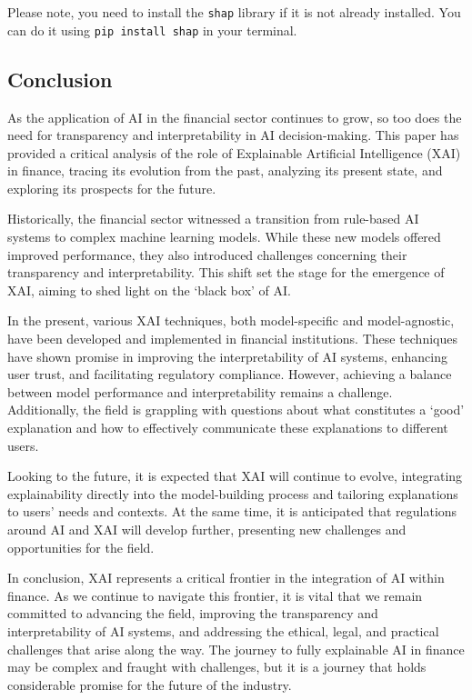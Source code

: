 \documentclass[
  letterpaper,
  DIV=11,
  numbers=noendperiod]{scrartcl}
\begin{document}
Please note, you need to install the \texttt{shap} library if it is not
already installed. You can do it using \texttt{pip\ install\ shap} in
your terminal.

\hypertarget{conclusion}{%
\subsection{Conclusion}\label{conclusion}}

As the application of AI in the financial sector continues to grow, so
too does the need for transparency and interpretability in AI
decision-making. This paper has provided a critical analysis of the role
of Explainable Artificial Intelligence (XAI) in finance, tracing its
evolution from the past, analyzing its present state, and exploring its
prospects for the future.

Historically, the financial sector witnessed a transition from
rule-based AI systems to complex machine learning models. While these
new models offered improved performance, they also introduced challenges
concerning their transparency and interpretability. This shift set the
stage for the emergence of XAI, aiming to shed light on the `black box'
of AI.

In the present, various XAI techniques, both model-specific and
model-agnostic, have been developed and implemented in financial
institutions. These techniques have shown promise in improving the
interpretability of AI systems, enhancing user trust, and facilitating
regulatory compliance. However, achieving a balance between model
performance and interpretability remains a challenge. Additionally, the
field is grappling with questions about what constitutes a `good'
explanation and how to effectively communicate these explanations to
different users.

Looking to the future, it is expected that XAI will continue to evolve,
integrating explainability directly into the model-building process and
tailoring explanations to users' needs and contexts. At the same time,
it is anticipated that regulations around AI and XAI will develop
further, presenting new challenges and opportunities for the field.

In conclusion, XAI represents a critical frontier in the integration of
AI within finance. As we continue to navigate this frontier, it is vital
that we remain committed to advancing the field, improving the
transparency and interpretability of AI systems, and addressing the
ethical, legal, and practical challenges that arise along the way. The
journey to fully explainable AI in finance may be complex and fraught
with challenges, but it is a journey that holds considerable promise for
the future of the industry.
\end{document}
